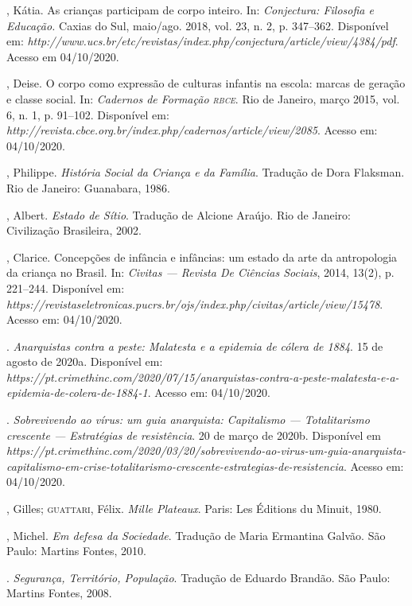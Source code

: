 \begin{bibliohedra}
, Kátia. As crianças participam de corpo inteiro. In:
\emph{Conjectura: Filosofia e Educação.} Caxias do Sul, maio/ago. 2018,
vol. 23, n. 2, p. 347--362. Disponível em:
\emph{http://www.ucs.br/etc/revistas/index.php/conjectura/article/view/4384/pdf}.
Acesso em 04/10/2020.

, Deise. O corpo como expressão de culturas infantis na escola:
marcas de geração e classe social. In: \emph{Cadernos de Formação \textsc{rbce}}.
Rio de Janeiro, março 2015, vol. 6, n. 1, p. 91--102. Disponível em:
\emph{http://revista.cbce.org.br/index.php/cadernos/article/view/2085}.
Acesso em: 04/10/2020.

, Philippe. \emph{História Social da Criança e da Família}.
Tradução de Dora Flaksman. Rio de Janeiro: Guanabara, 1986.

, Albert. \emph{Estado de Sítio}. Tradução de Alcione Araújo. Rio
de Janeiro: Civilização Brasileira, 2002.

, Clarice. Concepções de infância e infâncias: um estado da arte da
antropologia da criança no Brasil. In: \emph{Civitas --- Revista De
Ciências Sociais}, 2014, 13(2), p. 221--244. Disponível em:
\emph{https://revistaseletronicas.pucrs.br/ojs/index.php/civitas/article/view/15478}.
Acesso em: 04/10/2020.

. \emph{Anarquistas contra a peste: Malatesta e a epidemia de
cólera de 1884}. 15 de agosto de 2020a. Disponível em:
\emph{https://pt.crimethinc.com/2020/07/15/anarquistas-contra-a-peste-malatesta-e-a-epidemia-de-colera-de-1884-1}.
Acesso em: 04/10/2020.

\titidem. \emph{Sobrevivendo ao vírus: um guia anarquista: Capitalismo
--- Totalitarismo crescente --- Estratégias de resistência}. 20 de março
de 2020b. Disponível em
\emph{https://pt.crimethinc.com/2020/03/20/sobrevivendo-ao-virus-um-guia-anarquista-capitalismo-em-crise-totalitarismo-crescente-estrategias-de-resistencia}.
Acesso em: 04/10/2020.

, Gilles; \textsc{guattari}, Félix. \emph{Mille Plateaux}. Paris: Les
Éditions du Minuit, 1980.

, Michel. \emph{Em defesa da Sociedade}. Tradução de Maria
Ermantina Galvão. São Paulo: Martins Fontes, 2010.

\titidem. \emph{Segurança, Território, População}. Tradução de Eduardo
Brandão. São Paulo: Martins Fontes, 2008.


\end{bibliohedra}
